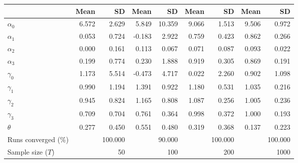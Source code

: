 
\begin{tabular}[t]{lrrrrrrrr}
\toprule
  & Mean & SD & Mean  & SD  & Mean   & SD   & Mean    & SD   \\
\midrule
$\alpha_{0}$ & 6.572 & 2.629 & 5.849 & 10.359 & 9.066 & 1.513 & 9.506 & 0.972\\
$\alpha_{1}$ & 0.053 & 0.724 & -0.183 & 2.922 & 0.759 & 0.423 & 0.862 & 0.266\\
$\alpha_{2}$ & 0.000 & 0.161 & 0.113 & 0.067 & 0.071 & 0.087 & 0.093 & 0.022\\
$\alpha_{3}$ & 0.199 & 0.774 & 0.230 & 1.888 & 0.919 & 0.305 & 0.869 & 0.191\\
$\gamma_{0}$ & 1.173 & 5.514 & -0.473 & 4.717 & 0.022 & 2.260 & 0.902 & 1.098\\
$\gamma_{1}$ & 0.990 & 1.194 & 1.391 & 0.922 & 1.180 & 0.531 & 1.035 & 0.216\\
$\gamma_{2}$ & 0.945 & 0.824 & 1.165 & 0.808 & 1.087 & 0.256 & 1.005 & 0.236\\
$\gamma_{3}$ & 0.709 & 0.704 & 0.761 & 0.364 & 0.998 & 0.372 & 1.000 & 0.193\\
$\theta$ & 0.277 & 0.450 & 0.551 & 0.480 & 0.319 & 0.368 & 0.137 & 0.223\\
Runs converged (\%) &  & 100.000 &  & 90.000 &  & 100.000 &  & 100.000\\
Sample size ($T$) &  & 50 &  & 100 &  & 200 &  & 1000\\
\bottomrule
\end{tabular}
